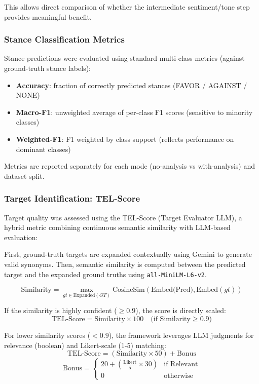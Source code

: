 \documentclass[conference]{IEEEtran}
\begin{document}
This allows direct comparison of whether the intermediate sentiment/tone step provides meaningful benefit.

\subsubsection{Stance Classification Metrics}

Stance predictions were evaluated using standard multi-class metrics (against ground-truth stance labels):
\begin{itemize}
    \item \textbf{Accuracy}: fraction of correctly predicted stances (FAVOR / AGAINST / NONE)
    \item \textbf{Macro-F1}: unweighted average of per-class F1 scores (sensitive to minority classes)
    \item \textbf{Weighted-F1}: F1 weighted by class support (reflects performance on dominant classes)
\end{itemize}

Metrics are reported separately for each mode (no-analysis vs with-analysis) and dataset split.

\subsubsection{Target Identification: TEL-Score}

Target quality was assessed using the TEL-Score (Target Evaluator LLM), a hybrid metric combining continuous semantic similarity with LLM-based evaluation:

First, ground-truth targets are expanded contextually using Gemini to generate valid synonyms. Then, semantic similarity is computed between the predicted target and the expanded ground truths using \texttt{all-MiniLM-L6-v2}.

\begin{equation}
\text{Similarity} = \max_{gt \in \text{Expanded}(GT)} \text{CosineSim} (\text{Embed(Pred)}, \text{Embed}(gt))
\end{equation}

If the similarity is highly confident ($\ge 0.9$), the score is directly scaled:
\begin{equation}
\text{TEL-Score} = \text{Similarity} \times 100 \quad \text{(if Similarity} \ge 0.9\text{)}
\end{equation}

For lower similarity scores ($< 0.9$), the framework leverages LLM judgments for relevance (boolean) and Likert-scale (1-5) matching:
\begin{equation}
\text{TEL-Score} = (\text{Similarity} \times 50) + \text{Bonus}
\end{equation}
\begin{equation}
\text{Bonus} = \begin{cases} 
20 + \left(\frac{\text{Likert}}{5} \times 30\right) & \text{if Relevant} \\
0 & \text{otherwise}
\end{cases}
\end{equation}
\end{document}

